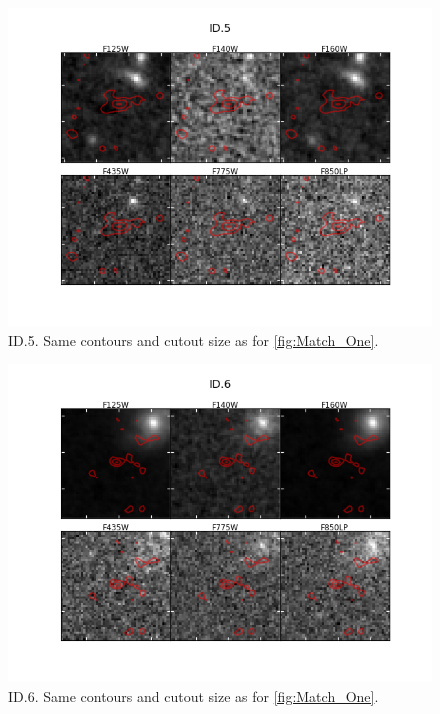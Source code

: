 \begin{figure}[tbp]
\centering \includegraphics[width=160mm]{Matched/ASPECS_Cutout_4.png}
\caption{ID.5. Same contours and cutout size as for \ref{fig:Match_One}.}
\label{fig:Match_Four}
\end{figure}

\begin{figure}[tbp]
\centering \includegraphics[width=160mm]{Matched/ASPECS_Cutout_5.png}
\caption{ID.6. Same contours and cutout size as for \ref{fig:Match_One}.}
\label{fig:Match_Five}
\end{figure}

